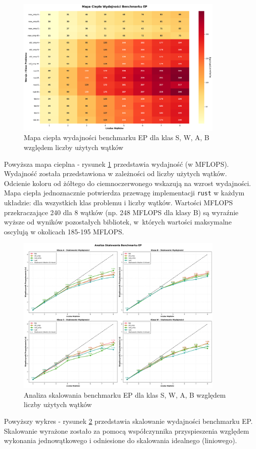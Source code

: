 \begin{figure}[H]
    \centering
    \includegraphics[width=0.9\textwidth]{analiza/images/parallel/ep/arm/ep_mapa_ciepla_wydajnosci.png}
    \caption{Mapa ciepła wydajności benchmarku EP dla klas S, W, A, B względem liczby użytych wątków}
    \label{ep_heatmap_wydajnosci}
\end{figure}
Powyższa mapa cieplna - rysunek \ref{ep_heatmap_wydajnosci} przedstawia wydajność (w MFLOPS). Wydajność została przedstawiona w zależności od liczby użytych wątków. Odcienie koloru od żółtego do ciemnoczerwonego wskazują na wzrost wydajności.\\
Mapa ciepła jednoznacznie potwierdza przewagę implementacji \texttt{rust} w każdym układzie: dla wszystkich klas problemu i liczby wątków. Wartości MFLOPS przekraczające 240 dla 8 wątków (np. 248 MFLOPS dla klasy B) są wyraźnie wyższe od wyników pozostałych bibliotek, w~których wartości maksymalne oscylują w okolicach 185-195 MFLOPS.



\begin{figure}[H]
    \centering
    \includegraphics[width=0.9\textwidth]{analiza/images/parallel/ep/arm/ep_analiza_skalowania.png}
    \caption{Analiza skalowania benchmarku EP dla klas S, W, A, B względem liczby użytych wątków}
    \label{ep_analiza_skalowania}
\end{figure}
Powyższy wykres - rysunek \ref{ep_analiza_skalowania} przedstawia skalowanie wydajności benchmarku EP. Skalowanie wyrażone zostało za pomocą współczynnika przyspieszenia względem wykonania jednowątkowego i odniesione do skalowania idealnego (liniowego).

